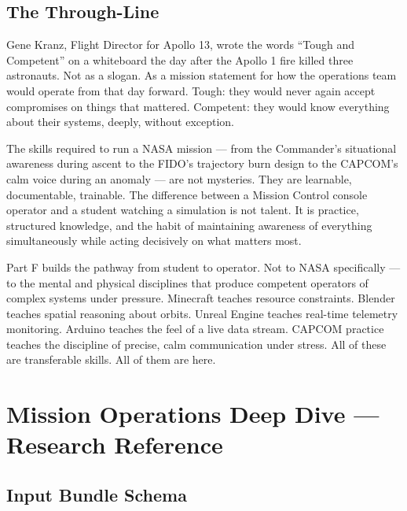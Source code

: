 \documentclass[11pt,letterpaper]{article}
\newcommand{\stageheader}[2]{%
  \noindent\colorbox{#2}{\makebox[\textwidth][l]{%
    \textcolor{white}{\bfseries\sffamily\hspace{6pt}#1\hspace{6pt}}}}%
  \vspace{0.5em}\par%
}
\begin{document}
\subsection{The Through-Line}

Gene Kranz, Flight Director for Apollo 13, wrote the words ``Tough and Competent'' on a whiteboard the day after the Apollo 1 fire killed three astronauts. Not as a slogan. As a mission statement for how the operations team would operate from that day forward. Tough: they would never again accept compromises on things that mattered. Competent: they would know everything about their systems, deeply, without exception.

The skills required to run a NASA mission --- from the Commander's situational awareness during ascent to the FIDO's trajectory burn design to the CAPCOM's calm voice during an anomaly --- are not mysteries. They are learnable, documentable, trainable. The difference between a Mission Control console operator and a student watching a simulation is not talent. It is practice, structured knowledge, and the habit of maintaining awareness of everything simultaneously while acting decisively on what matters most.

Part F builds the pathway from student to operator. Not to NASA specifically --- to the mental and physical disciplines that produce competent operators of complex systems under pressure. Minecraft teaches resource constraints. Blender teaches spatial reasoning about orbits. Unreal Engine teaches real-time telemetry monitoring. Arduino teaches the feel of a live data stream. CAPCOM practice teaches the discipline of precise, calm communication under stress. All of these are transferable skills. All of them are here.

\newpage

\stageheader{STAGE 2 --- RESEARCH REFERENCE}{secondary}

\section{Mission Operations Deep Dive --- Research Reference}

\subsection{Input Bundle Schema}
\end{document}
